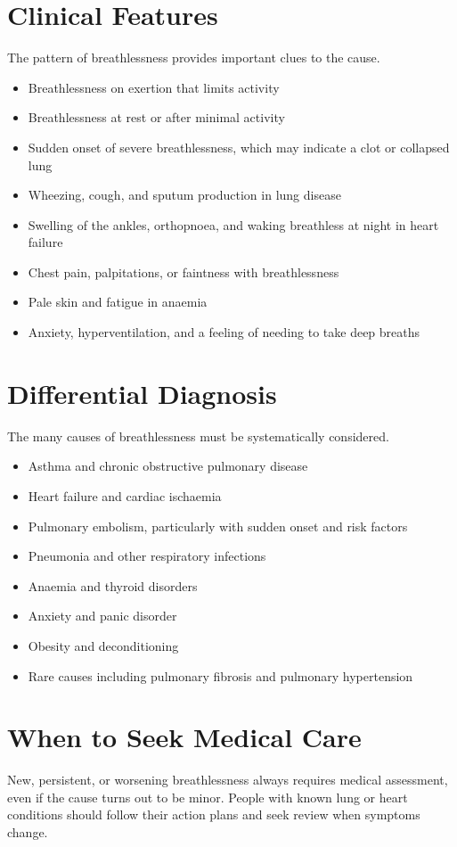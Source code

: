 \section*{Clinical Features}
The pattern of breathlessness provides important clues to the cause.
\begin{itemize}
    \item Breathlessness on exertion that limits activity
    \item Breathlessness at rest or after minimal activity
    \item Sudden onset of severe breathlessness, which may indicate a clot or collapsed lung
    \item Wheezing, cough, and sputum production in lung disease
    \item Swelling of the ankles, orthopnoea, and waking breathless at night in heart failure
    \item Chest pain, palpitations, or faintness with breathlessness
    \item Pale skin and fatigue in anaemia
    \item Anxiety, hyperventilation, and a feeling of needing to take deep breaths
\end{itemize}

\section*{Differential Diagnosis}
The many causes of breathlessness must be systematically considered.
\begin{itemize}
    \item Asthma and chronic obstructive pulmonary disease
    \item Heart failure and cardiac ischaemia
    \item Pulmonary embolism, particularly with sudden onset and risk factors
    \item Pneumonia and other respiratory infections
    \item Anaemia and thyroid disorders
    \item Anxiety and panic disorder
    \item Obesity and deconditioning
    \item Rare causes including pulmonary fibrosis and pulmonary hypertension
\end{itemize}

\section*{When to Seek Medical Care}
New, persistent, or worsening breathlessness always requires medical assessment, even if the cause turns out to be minor. People with known lung or heart conditions should follow their action plans and seek review when symptoms change.

